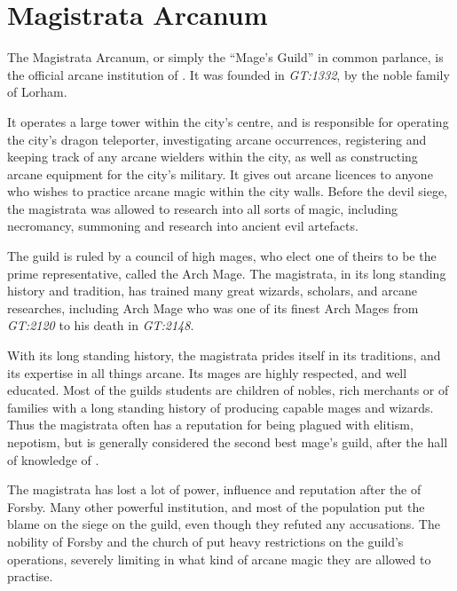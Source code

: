 \section{Magistrata Arcanum}
\label{sec:Magistrata Arcanum}
\label{sec:Mages Guild}

The Magistrata Arcanum, or simply the ``Mage's Guild'' in common parlance, is
the official arcane institution of . It was founded in
\emph{GT:1332}, by the noble family of Lorham.

It operates a large tower within the city's centre, and is responsible for
operating the city's dragon teleporter, investigating arcane occurrences,
registering and keeping track of any arcane wielders within the city, as well
as constructing arcane equipment for the city's military. It gives out arcane
licences to anyone who wishes to practice arcane magic within the city walls.
Before the devil siege, the magistrata was allowed to research into all sorts
of magic, including necromancy, summoning and research into ancient evil
artefacts.

The guild is ruled by a council of high mages, who elect one of theirs to be
the prime representative, called the Arch Mage. The magistrata, in its long
standing history and tradition, has trained many great wizards, scholars,
and arcane researches, including Arch Mage  who
was one of its finest Arch Mages from \emph{GT:2120} to his death in
\emph{GT:2148}.

With its long standing history, the magistrata prides itself in its traditions,
and its expertise in all things arcane. Its mages are highly respected, and well
educated. Most of the guilds students are children of nobles, rich merchants or
of families with a long standing history of producing capable mages and wizards.
Thus the magistrata often has a reputation for being plagued with elitism,
nepotism, but is generally considered the second best mage's guild, after the
hall of knowledge of .

The magistrata has lost a lot of power, influence and reputation after the
 of Forsby. Many other powerful institution, and most
of the population put the blame on the siege on the guild, even though they
refuted any accusations. The nobility of Forsby and the church of
 put heavy restrictions on the guild's operations, severely
limiting in what kind of arcane magic they are allowed to practise.
